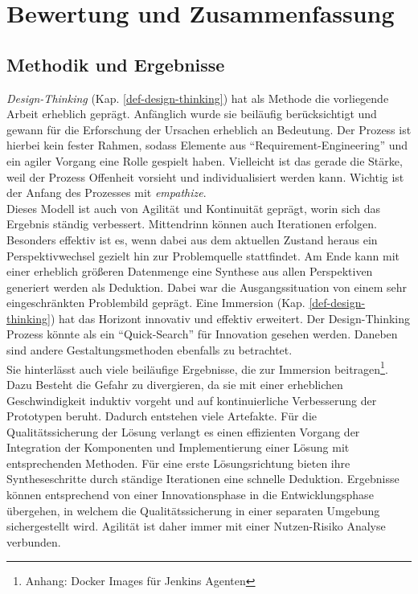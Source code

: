 \chapter{Bewertung und Zusammenfassung}
\label{chapter:evaluation}

\section{Methodik und Ergebnisse}
\emph{Design-Thinking} (Kap. \ref{def-design-thinking}) hat als Methode die vorliegende Arbeit erheblich geprägt. Anfänglich wurde sie beiläufig berücksichtigt und gewann für die Erforschung der Ursachen erheblich an Bedeutung. Der Prozess ist hierbei kein fester Rahmen, sodass Elemente aus \enquote{Requirement-Engineering} und ein agiler Vorgang eine Rolle gespielt haben. Vielleicht ist das gerade die Stärke, weil der Prozess Offenheit vorsieht und individualisiert werden kann. Wichtig ist der Anfang des Prozesses mit \emph{empathize}.
\medskip
\\
Dieses Modell ist auch von Agilität und Kontinuität geprägt, worin sich das Ergebnis ständig verbessert. Mittendrinn können auch Iterationen erfolgen.
Besonders effektiv ist es, wenn dabei aus dem aktuellen Zustand heraus ein Perspektivwechsel gezielt hin zur Problemquelle stattfindet. Am Ende kann mit einer erheblich größeren Datenmenge eine Synthese aus allen Perspektiven generiert werden als Deduktion. Dabei war die Ausgangssituation von einem sehr eingeschränkten Problembild geprägt. Eine Immersion (Kap. \ref{def-design-thinking}) hat das Horizont innovativ und effektiv erweitert. 
Der Design-Thinking Prozess könnte als ein \enquote{Quick-Search} für Innovation gesehen werden. Daneben sind andere Gestaltungsmethoden ebenfalls zu betrachtet.
\medskip
\\
Sie hinterlässt auch viele beiläufige Ergebnisse, die zur Immersion beitragen\footnote{Anhang: Docker Images für Jenkins Agenten\label{appendix:docker}}. Dazu Besteht die Gefahr zu divergieren, da sie mit einer erheblichen Geschwindigkeit induktiv vorgeht und auf kontinuierliche Verbesserung der Prototypen beruht. Dadurch entstehen viele Artefakte.
Für die Qualitätssicherung der Lösung verlangt es einen effizienten Vorgang der Integration der Komponenten und Implementierung einer Lösung mit entsprechenden Methoden. Für eine erste Lösungsrichtung bieten ihre Syntheseschritte durch ständige Iterationen eine schnelle Deduktion. Ergebnisse können entsprechend von einer Innovationsphase in die Entwicklungsphase übergehen, in welchem die Qualitätssicherung in einer separaten Umgebung sichergestellt wird. Agilität ist daher immer mit einer Nutzen-Risiko Analyse verbunden.

